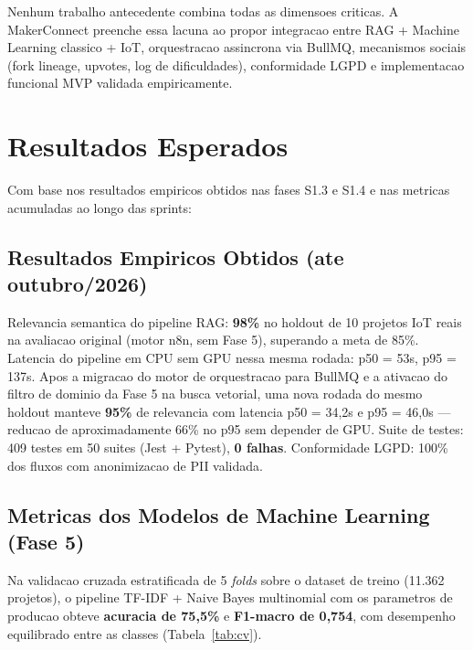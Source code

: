 \documentclass[portuguese]{sbcreviews-2025}%
\begin{document}
Nenhum trabalho antecedente combina todas as dimensoes criticas. A MakerConnect preenche essa lacuna ao propor integracao entre RAG + Machine Learning classico + IoT, orquestracao assincrona via BullMQ, mecanismos sociais (fork lineage, upvotes, log de dificuldades), conformidade LGPD e implementacao funcional MVP validada empiricamente.

\section{Resultados Esperados}

Com base nos resultados empiricos obtidos nas fases S1.3 e S1.4 e nas metricas acumuladas ao longo das sprints:

\subsection{Resultados Empiricos Obtidos (ate outubro/2026)}

Relevancia semantica do pipeline RAG: \textbf{98\%} no holdout de 10 projetos IoT reais na avaliacao original (motor n8n, sem Fase 5), superando a meta de 85\%. Latencia do pipeline em CPU sem GPU nessa mesma rodada: p50 = 53s, p95 = 137s. Apos a migracao do motor de orquestracao para BullMQ e a ativacao do filtro de dominio da Fase 5 na busca vetorial, uma nova rodada do mesmo holdout manteve \textbf{95\%} de relevancia com latencia p50 = 34,2s e p95 = 46,0s --- reducao de aproximadamente 66\% no p95 sem depender de GPU. Suite de testes: 409 testes em 50 suites (Jest + Pytest), \textbf{0 falhas}. Conformidade LGPD: 100\% dos fluxos com anonimizacao de PII validada.

\subsection{Metricas dos Modelos de Machine Learning (Fase 5)}

Na validacao cruzada estratificada de 5 \textit{folds} sobre o dataset de treino (11.362 projetos), o pipeline TF-IDF + Naive Bayes multinomial com os parametros de producao obteve \textbf{acuracia de 75,5\%} e \textbf{F1-macro de 0,754}, com desempenho equilibrado entre as classes (Tabela~\ref{tab:cv}).
\end{document}
